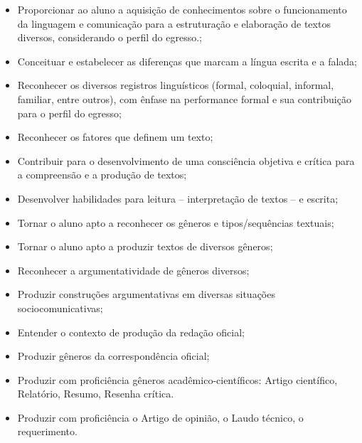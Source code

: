 \begin{itemize}

\item Proporcionar ao aluno a aquisição de conhecimentos sobre o funcionamento da linguagem e comunicação para a estruturação e elaboração de textos diversos, considerando o perfil do egresso.;
\item Conceituar e estabelecer as diferenças que marcam a língua escrita e a falada;
\item Reconhecer os diversos registros linguísticos (formal, coloquial, informal, familiar, entre outros), com ênfase na performance formal e sua contribuição para o perfil do egresso;
\item Reconhecer os fatores que definem um texto;
\item Contribuir para o desenvolvimento de uma consciência objetiva e crítica para a compreensão e a produção de textos;
\item Desenvolver habilidades para leitura – interpretação de textos – e escrita;
\item Tornar o aluno apto a reconhecer os gêneros e tipos/sequências textuais;
\item Tornar o aluno apto a produzir textos de diversos gêneros;
\item Reconhecer a argumentatividade de gêneros diversos;
\item Produzir construções argumentativas em diversas situações sociocomunicativas;
\item Entender o contexto de produção da redação oficial;
\item Produzir gêneros da correspondência oficial;
\item Produzir com proficiência gêneros acadêmico-científicos: Artigo científico, Relatório, Resumo, Resenha crítica.
\item Produzir com proficiência o Artigo de opinião, o Laudo técnico, o requerimento.

\end{itemize} 




